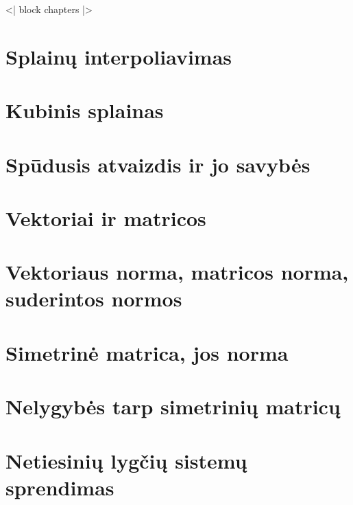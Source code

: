 <| block chapters |>
\newcommand{\cinput}[1]{}

\cinput{01.tex}   %
\cinput{02.tex}   %
\cinput{03.tex}   %
\cinput{04.tex}   %

\section{Splainų interpoliavimas}
\cite[170-173]{textbook}
\section{Kubinis splainas}
\cite[174-175]{textbook}

\section{Spūdusis atvaizdis ir jo savybės}
\cite[43-44]{textbook}
\section{Vektoriai ir matricos}
\section{Vektoriaus norma, matricos norma, suderintos normos}
\cite[43-44]{textbook}
\cite[104]{textbook}
\section{Simetrinė matrica, jos norma}
\section{Nelygybės tarp simetrinių matricų}
\cite[99]{textbook}
\section{Netiesinių lygčių sistemų sprendimas}
\cite[43-48]{textbook}

